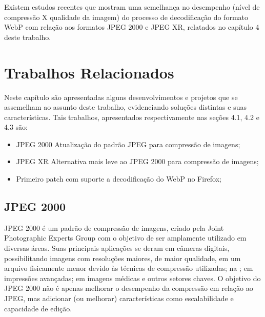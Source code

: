 \documentclass[espaco=simples,appendix=Name]{abnt}
\begin{document}
Existem estudos recentes \cite{VP8Performance} que mostram uma semelhança no desempenho (nível de compressão X qualidade da imagem) do processo de decodificação do formato WebP com relação aos formatos JPEG 2000 e JPEG XR, relatados no capítulo 4 deste trabalho.

\chapter{Trabalhos Relacionados}

Neste capítulo são apresentadas alguns desenvolvimentos e projetos que se assemelham ao assunto deste trabalho, evidenciando soluções distintas e suas características. Tais trabalhos, apresentados respectivamente nas seções 4.1, 4.2 e 4.3 são:

\begin{itemize}
	\item JPEG 2000 Atualização do padrão JPEG para compressão de imagens;
	\item JPEG XR Alternativa mais leve ao JPEG 2000 para compressão de imagens;
	\item Primeiro patch com suporte a decodificação do WebP no Firefox;
\end{itemize}


\section{JPEG 2000}

JPEG 2000 é um padrão de compressão de imagens, criado pela Joint Photographic Experts Group com o objetivo de ser amplamente utilizado em diversas áreas. Suas principais aplicações se deram em câmeras digitais, possibilitando imagens com resoluções maiores, de maior qualidade, em um arquivo fisicamente menor devido às técnicas de compressão utilizadas; na ; em impressões avançadas; em imagens médicas e outros setores chaves. O objetivo do JPEG 2000 não é apenas melhorar o desempenho da compressão em relação ao JPEG, mas adicionar (ou melhorar) características como escalabilidade e capacidade de edição.
\end{document}
